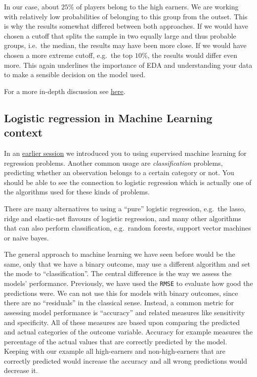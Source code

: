 \documentclass[
]{book}
\begin{document}
In our case, about \(25\%\) of players belong to the high earners. We are working
with relatively low probabilities of belonging to this group from the outset.
This is why the results somewhat differed between both approaches. If we would
have chosen a cutoff that splits the sample in two equally large and thus
probable groups, i.e.~the median, the results may have been more close. If we
would have chosen a more extreme cutoff, e.g.~the top \(10\%\), the results
would differ even more. This again underlines the importance of EDA and
understanding your data to make a sensible decision on the model used.

For a more in-depth discussion see
\href{https://statisticalhorizons.com/linear-vs-logistic/}{here}.

\hypertarget{logistic-regression-in-machine-learning-context}{%
\subsection{Logistic regression in Machine Learning context}\label{logistic-regression-in-machine-learning-context}}

In an \protect\hyperlink{ml}{earlier session} we introduced you to using supervised machine
learning for regression problems. Another common usage are \emph{classification}
problems, predicting whether an observation belongs to a certain category or
not. You should be able to see the connection to logistic regression which is
actually one of the algorithms used for these kinds of problems.

There are many alternatives to using a ``pure'' logistic regression, e.g.~the
lasso, ridge and elastic-net flavours of logistic regression, and many
other algorithms that can also perform classification, e.g.~random forests,
support vector machines or naive bayes.

The general approach to machine learning we have seen before would be the same,
only that we have a binary outcome, may use a different algorithm and set the
mode to ``classification''. The central difference is the way we assess the
models' performance. Previously, we have used the \texttt{RMSE} to
evaluate how good the predictions were. We can not use this for
models with binary outcomes, since there are no ``residuals'' in the
classical sense. Instead, a common metric for assessing model performance
is ``accuracy'' and related measures like sensitivity and specificity.
All of these measures are based upon comparing the predicted and actual
categories of the outcome variable. Accuracy for example measures the percentage
of the actual values that are correctly predicted by the model. Keeping with
our example all high-earners and non-high-earners that are correctly predicted
would increase the accuracy and all wrong predictions would decrease it.
\end{document}
